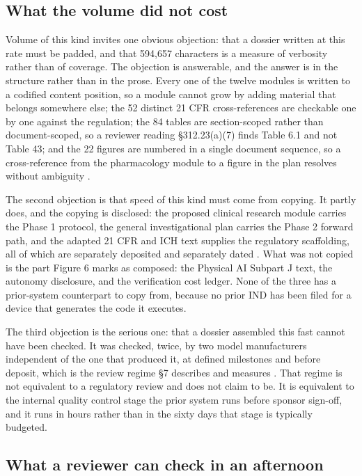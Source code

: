 \subsection{What the volume did not cost}

Volume of this kind invites one obvious objection: that a dossier written at
this rate must be padded, and that 594,657 characters is a measure of verbosity
rather than of coverage. The objection is answerable, and the answer is in the
structure rather than in the prose. Every one of the twelve modules is written
to a codified content position, so a module cannot grow by adding material that
belongs somewhere else; the 52 distinct 21 CFR cross-references are checkable
one by one against the regulation; the 84 tables are section-scoped rather than
document-scoped, so a reviewer reading \S 312.23(a)(7) finds Table 6.1 and not
Table 43; and the 22 figures are numbered in a single document sequence, so a
cross-reference from the pharmacology module to a figure in the plan resolves
without ambiguity \cite{phase1ind}.

The second objection is that speed of this kind must come from copying. It
partly does, and the copying is disclosed: the proposed clinical research module
carries the Phase 1 protocol, the general investigational plan carries the Phase
2 forward path, and the adapted 21 CFR and ICH text supplies the regulatory
scaffolding, all of which are separately deposited and separately dated
\cite{onpremwhippl, phase2proto, natplatform2026}. What was not copied is the
part Figure 6 marks as composed: the Physical AI Subpart J text, the autonomy
disclosure, and the verification cost ledger. None of the three has a
prior-system counterpart to copy from, because no prior IND has been filed for a
device that generates the code it executes.

The third objection is the serious one: that a dossier assembled this fast
cannot have been checked. It was checked, twice, by two model manufacturers
independent of the one that produced it, at defined milestones and before
deposit, which is the review regime \S7 describes and measures
\cite{aiprgliomatc, rfarm27001v2}. That regime is not equivalent to a regulatory
review and does not claim to be. It is equivalent to the internal quality
control stage the prior system runs before sponsor sign-off, and it runs in
hours rather than in the sixty days that stage is typically budgeted.

\subsection{What a reviewer can check in an afternoon}

